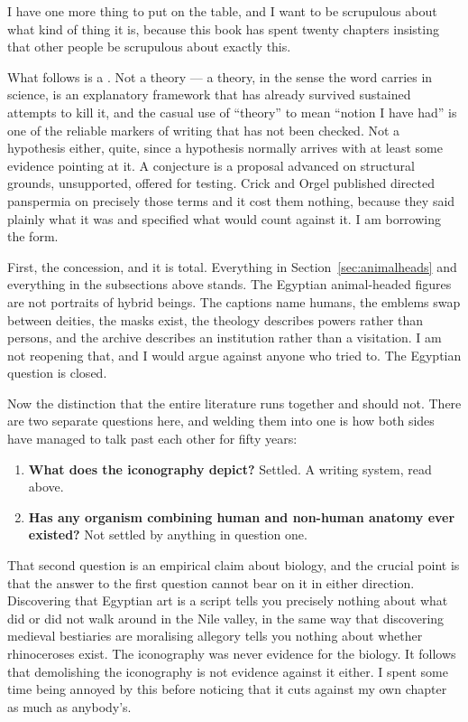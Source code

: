 I have one more thing to put on the table, and I want to be scrupulous about what kind of thing it
is, because this book has spent twenty chapters insisting that other people be scrupulous about
exactly this.

What follows is a . Not a theory --- a theory, in the sense the word carries in
science, is an explanatory framework that has already survived sustained attempts to kill it, and
the casual use of ``theory'' to mean ``notion I have had'' is one of the reliable markers of writing
that has not been checked. Not a hypothesis either, quite, since a hypothesis normally arrives with
at least some evidence pointing at it. A conjecture is a proposal advanced on structural grounds,
unsupported, offered for testing. Crick and Orgel published directed panspermia on precisely those
terms and it cost them nothing, because they said plainly what it was and specified what would
count against it. I am borrowing the form.

First, the concession, and it is total. Everything in Section~\ref{sec:animalheads} and everything
in the subsections above stands. The Egyptian animal-headed figures are not portraits of hybrid
beings. The captions name humans, the emblems swap between deities, the masks exist, the theology
describes powers rather than persons, and the archive describes an institution rather than a
visitation. I am not reopening that, and I would argue against anyone who tried to. The Egyptian
question is closed.

Now the distinction that the entire literature runs together and should not. There are two separate
questions here, and welding them into one is how both sides have managed to talk past each other
for fifty years:

\begin{enumerate}
  \item \textbf{What does the iconography depict?} Settled. A writing system, read above.
  \item \textbf{Has any organism combining human and non-human anatomy ever existed?} Not settled
  by anything in question one.
\end{enumerate}

That second question is an empirical claim about biology, and the crucial point is that the answer
to the first question cannot bear on it in either direction. Discovering that Egyptian art is a
script tells you precisely nothing about what did or did not walk around in the Nile valley, in the
same way that discovering medieval bestiaries are moralising allegory tells you nothing about
whether rhinoceroses exist. The iconography was never evidence for the biology. It follows that
demolishing the iconography is not evidence against it either. I spent some time being annoyed by
this before noticing that it cuts against my own chapter as much as anybody's.

